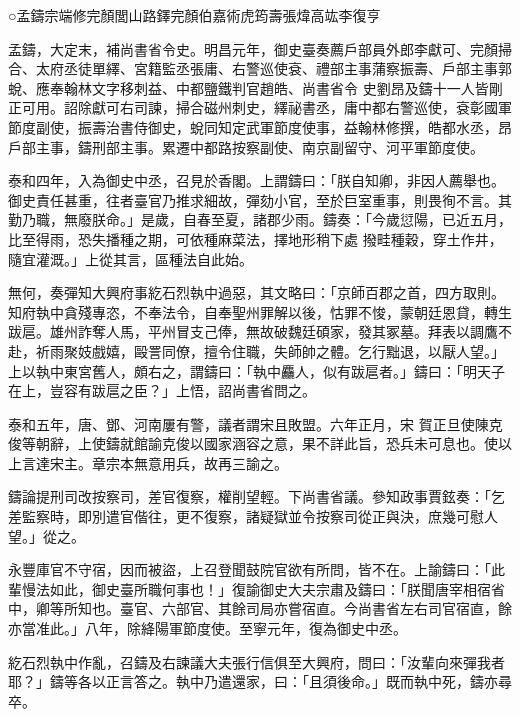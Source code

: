 
\begin{pinyinscope}

 ○孟鑄宗端修完顏閭山路鐸完顏伯嘉術虎筠壽張煒高竑李復亨



 孟鑄，大定末，補尚書省令史。明昌元年，御史臺奏薦戶部員外郎李獻可、完顏掃合、太府丞徒單繹、宮籍監丞張庸、右警巡使袞、禮部主事蒲察振壽、戶部主事郭蛻、應奉翰林文字移刺益、中都鹽鐵判官趙皓、尚書省令
 史劉昂及鑄十一人皆剛正可用。詔除獻可右司諫，掃合磁州刺史，繹祕書丞，庸中都右警巡使，袞彰國軍節度副使，振壽治書侍御史，蛻同知定武軍節度使事，益翰林修撰，皓都水丞，昂戶部主事，鑄刑部主事。累遷中都路按察副使、南京副留守、河平軍節度使。



 泰和四年，入為御史中丞，召見於香閣。上謂鑄曰：「朕自知卿，非因人薦舉也。御史責任甚重，往者臺官乃推求細故，彈劾小官，至於巨室重事，則畏徇不言。其勤乃職，無廢朕命。」是歲，自春至夏，諸郡少雨。鑄奏：「今歲愆陽，已近五月，比至得雨，恐失播種之期，可依種麻菜法，擇地形稍下處
 撥畦種穀，穿土作井，隨宜灌溉。」上從其言，區種法自此始。



 無何，奏彈知大興府事紇石烈執中過惡，其文略曰：「京師百郡之首，四方取則。知府執中貪殘專恣，不奉法令，自奉聖州罪解以後，怙罪不悛，蒙朝廷恩貸，轉生跋扈。雄州詐奪人馬，平州冒支己俸，無故破魏廷碩家，發其冢墓。拜表以調鷹不赴，祈雨聚妓戲嬉，毆詈同僚，擅令住職，失師帥之體。乞行黜退，以厭人望。」上以執中東宮舊人，頗右之，謂鑄曰：「執中麤人，似有跋扈者。」鑄曰：「明天子在上，豈容有跋扈之臣？」上悟，詔尚書省問之。



 泰和五年，唐、鄧、河南屢有警，議者謂宋且敗盟。六年正月，宋
 賀正旦使陳克俊等朝辭，上使鑄就館諭克俊以國家涵容之意，果不詳此旨，恐兵未可息也。使以上言達宋主。章宗本無意用兵，故再三諭之。



 鑄論提刑司改按察司，差官復察，權削望輕。下尚書省議。參知政事賈鉉奏：「乞差監察時，即別遣官偕往，更不復察，諸疑獄並令按察司從正與決，庶幾可慰人望。」從之。



 永豐庫官不守宿，因而被盜，上召登聞鼓院官欲有所問，皆不在。上諭鑄曰：「此輩慢法如此，御史臺所職何事也！」復諭御史大夫宗肅及鑄曰：「朕聞唐宰相宿省中，卿等所知也。臺官、六部官、其餘司局亦嘗宿直。今尚書省左右司官宿直，餘
 亦當准此。」八年，除絳陽軍節度使。至寧元年，復為御史中丞。



 紇石烈執中作亂，召鑄及右諫議大夫張行信俱至大興府，問曰：「汝輩向來彈我者耶？」鑄等各以正言答之。執中乃遣還家，曰：「且須後命。」既而執中死，鑄亦尋卒。




\end{pinyinscope}
